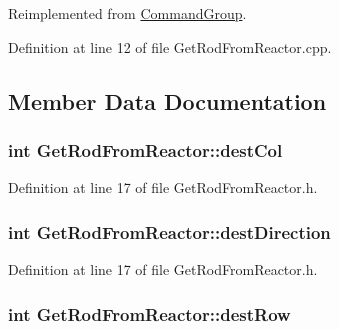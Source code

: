 Reimplemented from \hyperlink{classCommandGroup_a99800c5dbd05ab750aa0bb27518d0467}{Command\-Group}.



Definition at line 12 of file Get\-Rod\-From\-Reactor.\-cpp.



\subsection{Member Data Documentation}
\hypertarget{classGetRodFromReactor_a375425052a9973441a9a990f79fedd93}{
\subsubsection[{dest\-Col}]{\setlength{\rightskip}{0pt plus 5cm}int Get\-Rod\-From\-Reactor\-::dest\-Col\hspace{0.3cm}{\ttfamily [private]}}}\label{classGetRodFromReactor_a375425052a9973441a9a990f79fedd93}


Definition at line 17 of file Get\-Rod\-From\-Reactor.\-h.

\hypertarget{classGetRodFromReactor_a04f79f55c3202c51136455a9c29b7273}{
\subsubsection[{dest\-Direction}]{\setlength{\rightskip}{0pt plus 5cm}int Get\-Rod\-From\-Reactor\-::dest\-Direction\hspace{0.3cm}{\ttfamily [private]}}}\label{classGetRodFromReactor_a04f79f55c3202c51136455a9c29b7273}


Definition at line 17 of file Get\-Rod\-From\-Reactor.\-h.

\hypertarget{classGetRodFromReactor_a6e7a2b3591016b6c7fec6b908fd0a3e7}{
\subsubsection[{dest\-Row}]{\setlength{\rightskip}{0pt plus 5cm}int Get\-Rod\-From\-Reactor\-::dest\-Row\hspace{0.3cm}{\ttfamily [private]}}}\label{classGetRodFromReactor_a6e7a2b3591016b6c7fec6b908fd0a3e7}


